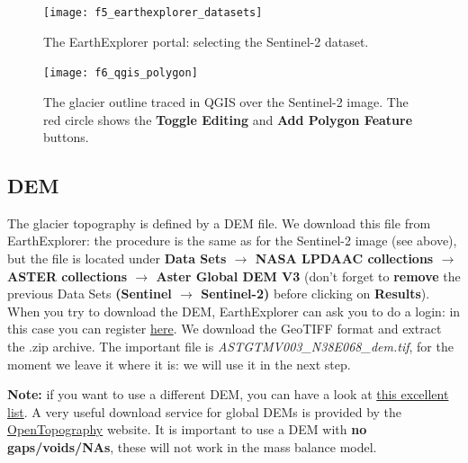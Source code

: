 \documentclass[15pt]{extarticle}
\begin{document}
\begin{figure}[hp]
    \centering
    \texttt{[image: f5\_earthexplorer\_datasets]}
    \caption{The EarthExplorer portal: selecting the Sentinel-2 dataset.}
    \label{fig:f5_earthexplorer_datasets}
\end{figure}

\begin{figure}[hp]
    \centering
    \texttt{[image: f6\_qgis\_polygon]}
    \caption{The glacier outline traced in QGIS over the Sentinel-2 image. The red circle shows the \textbf{Toggle Editing} and \textbf{Add Polygon Feature} buttons.}
    \label{fig:f6_qgis_polygon}
\end{figure}


\subsection{DEM}
\label{sect:input_dem}
The glacier topography is defined by a DEM file. We download this file from EarthExplorer: the procedure is the same as for the Sentinel-2 image (see above), but the file is located under \textbf{Data Sets $\rightarrow$ NASA LPDAAC collections $\rightarrow$ ASTER collections $\rightarrow$ Aster Global DEM V3} (don't forget to \textbf{remove} the previous Data Sets \textbf{(Sentinel $\rightarrow$ Sentinel-2)} before clicking on \textbf{Results}). When you try to download the DEM, EarthExplorer can ask you to do a login: in this case you can register \href{https://urs.earthdata.nasa.gov/users/new}{here}. We download the GeoTIFF format and extract the .zip archive. The important file is \textit{ASTGTMV003\_N38E068\_dem.tif}, for the moment we leave it where it is: we will use it in the next step.

\textbf{Note:} if you want to use a different DEM, you can have a look at \href{https://www.usna.edu/Users/oceano/pguth/md_help/html/global_dems.html}{this excellent list}. A very useful download service for global DEMs is provided by the \href{https://portal.opentopography.org/dataCatalog?group=global}{OpenTopography} website. It is important to use a DEM with \textbf{no gaps/voids/NAs}, these will not work in the mass balance model.
\end{document}

